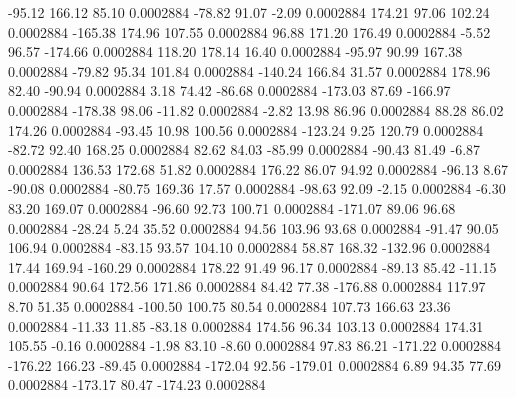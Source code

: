      -95.12      166.12       85.10     0.0002884
      -78.82       91.07       -2.09     0.0002884
      174.21       97.06      102.24     0.0002884
     -165.38      174.96      107.55     0.0002884
       96.88      171.20      176.49     0.0002884
       -5.52       96.57     -174.66     0.0002884
      118.20      178.14       16.40     0.0002884
      -95.97       90.99      167.38     0.0002884
      -79.82       95.34      101.84     0.0002884
     -140.24      166.84       31.57     0.0002884
      178.96       82.40      -90.94     0.0002884
        3.18       74.42      -86.68     0.0002884
     -173.03       87.69     -166.97     0.0002884
     -178.38       98.06      -11.82     0.0002884
       -2.82       13.98       86.96     0.0002884
       88.28       86.02      174.26     0.0002884
      -93.45       10.98      100.56     0.0002884
     -123.24        9.25      120.79     0.0002884
      -82.72       92.40      168.25     0.0002884
       82.62       84.03      -85.99     0.0002884
      -90.43       81.49       -6.87     0.0002884
      136.53      172.68       51.82     0.0002884
      176.22       86.07       94.92     0.0002884
      -96.13        8.67      -90.08     0.0002884
      -80.75      169.36       17.57     0.0002884
      -98.63       92.09       -2.15     0.0002884
       -6.30       83.20      169.07     0.0002884
      -96.60       92.73      100.71     0.0002884
     -171.07       89.06       96.68     0.0002884
      -28.24        5.24       35.52     0.0002884
       94.56      103.96       93.68     0.0002884
      -91.47       90.05      106.94     0.0002884
      -83.15       93.57      104.10     0.0002884
       58.87      168.32     -132.96     0.0002884
       17.44      169.94     -160.29     0.0002884
      178.22       91.49       96.17     0.0002884
      -89.13       85.42      -11.15     0.0002884
       90.64      172.56      171.86     0.0002884
       84.42       77.38     -176.88     0.0002884
      117.97        8.70       51.35     0.0002884
     -100.50      100.75       80.54     0.0002884
      107.73      166.63       23.36     0.0002884
      -11.33       11.85      -83.18     0.0002884
      174.56       96.34      103.13     0.0002884
      174.31      105.55       -0.16     0.0002884
       -1.98       83.10       -8.60     0.0002884
       97.83       86.21     -171.22     0.0002884
     -176.22      166.23      -89.45     0.0002884
     -172.04       92.56     -179.01     0.0002884
        6.89       94.35       77.69     0.0002884
     -173.17       80.47     -174.23     0.0002884
